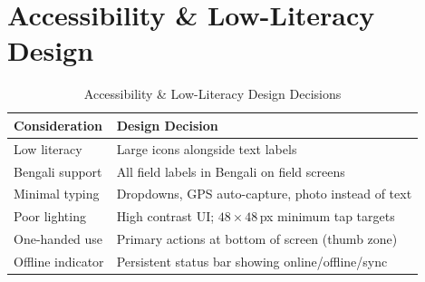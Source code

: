 \section{Accessibility \& Low-Literacy Design}
\begin{table}[H]
\centering
\caption{Accessibility \& Low-Literacy Design Decisions}
\label{tab:a11y}
\begin{tabularx}{\textwidth}{@{}lX@{}}
\toprule
Consideration & Design Decision \\
\midrule
Low literacy & Large icons alongside text labels \\
Bengali support & All field labels in Bengali on field screens \\
Minimal typing & Dropdowns, GPS auto-capture, photo instead of text \\
Poor lighting & High contrast UI; $48\times48$\,px minimum tap targets \\
One-handed use & Primary actions at bottom of screen (thumb zone) \\
Offline indicator & Persistent status bar showing online/offline/sync \\
\bottomrule
\end{tabularx}
\end{table}
